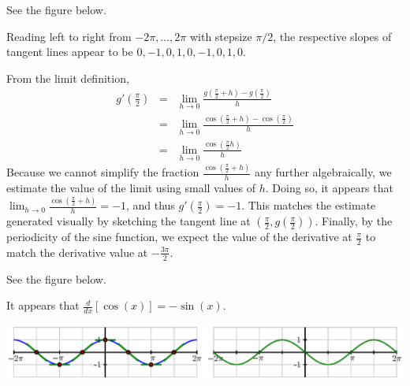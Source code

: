 \begin{activitySolution}
\ba
	\item See the figure below.
	\item Reading left to right from $-2\pi, \ldots, 2\pi$ with stepsize $\pi/2$, the respective slopes of tangent lines appear to be $0,-1,0,1,0,-1,0,1,0$.
	\item From the limit definition,
	\begin{eqnarray*}
	g'(\frac{\pi}{2}) & = & \lim_{h \to 0} \frac{g(\frac{\pi}{2} + h) - g(\frac{\pi}{2})}{h} \\
	       & = & \lim_{h \to 0} \frac{\cos(\frac{\pi}{2} + h) - \cos(\frac{\pi}{2})}{h} \\
	       & = & \lim_{h \to 0} \frac{\cos(\frac{\pi}{2}h)}{h} 
	\end{eqnarray*}
	Because we cannot simplify the fraction $\frac{\cos(\frac{\pi}{2}+h)}{h}$ any further algebraically, we estimate the value of the limit using small values of $h$.  Doing so, it appears that $\lim_{h \to 0} \frac{\cos(\frac{\pi}{2}+h)}{h}  = -1$, and thus $g'(\frac{\pi}{2}) = -1$.  This matches the estimate generated visually by sketching the tangent line at $(\frac{\pi}{2},g(\frac{\pi}{2}))$.  Finally, by the periodicity of the sine function, we expect the value of the derivative at $\frac{\pi}{2}$ to match the derivative value at $-\frac{3\pi}{2}$.
	\item See the figure below.
	\item It appears that $\frac{d}{dx}[\cos(x)] = -\sin(x)$.
\ea
\begin{center}
\includegraphics{figures/2_2_cosineSoln.eps} %
\end{center}
\end{activitySolution}
\aftera